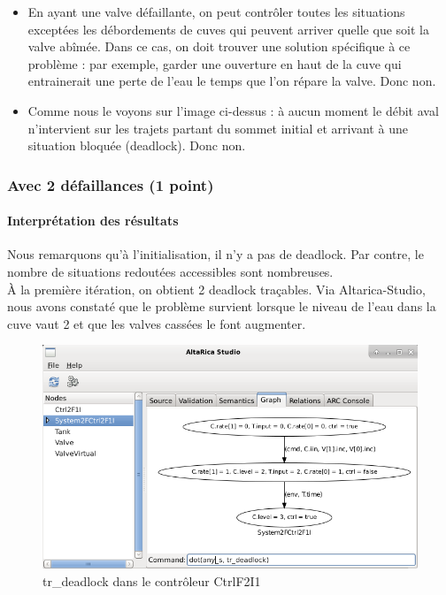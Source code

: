 \documentclass[a4paper]{book}
\begin{document}
\begin{itemize}
	\item En ayant une valve défaillante, on peut contrôler toutes les situations exceptées les débordements de cuves qui peuvent arriver quelle que soit la valve abîmée. Dans ce cas, on doit trouver une solution spécifique à ce problème : par exemple, garder une ouverture en haut de la cuve qui entrainerait une perte de l'eau le temps que l'on répare la valve. Donc non.
	\item Comme nous le voyons sur l'image ci-dessus : à aucun moment le débit aval n'intervient sur les trajets partant du sommet initial et arrivant à une situation bloquée (deadlock). Donc non.
\end{itemize}

\subsubsection{Avec 2 défaillances (1 point)}





\paragraph{Interprétation des résultats}

Nous remarquons qu'à l'initialisation, il n'y a pas de deadlock. Par contre, le nombre de situations redoutées accessibles sont nombreuses. \\
À la première itération, on obtient 2 deadlock traçables. Via Altarica-Studio, nous avons constaté que le problème survient lorsque le niveau de l'eau dans la cuve vaut 2 et que les valves cassées le font augmenter.

\begin{figure}[H]
  \centering
  \includegraphics[width=14cm]{img/CtrlF2I1.png}
  \caption{tr\_deadlock dans le contrôleur CtrlF2I1}
\end{figure}
\end{document}
